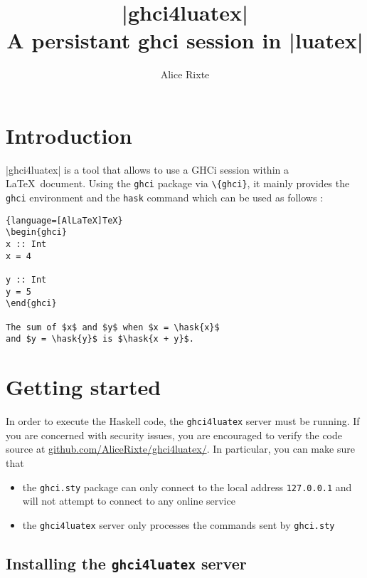 \documentclass{article}
\title{|ghci4luatex| \\ \vspace{0.4em}
  \large A persistant ghci session in |luatex|}
\author{Alice Rixte}
\begin{document}
\maketitle
\tableofcontents

\newpage

\section{Introduction}


|ghci4luatex| is a tool that allows to use a GHCi session within a \LaTeX\ document. Using the \texttt{ghci} package via \texttt{\textbackslash {}\{ghci\}}, it mainly provides the \texttt{ghci} environment and the \texttt{hask} command which can be used as follows :

\begin{latexbox}
  \begin{lstlisting}{language=[AlLaTeX]TeX}
\begin{ghci}
x :: Int
x = 4

y :: Int
y = 5
\end{ghci}

The sum of $x$ and $y$ when $x = \hask{x}$
and $y = \hask{y}$ is $\hask{x + y}$.

\end{lstlisting}
\end{latexbox}

\section{Getting started}

In order to execute the Haskell code, the \texttt{ghci4luatex} server must be running. If you are concerned with security issues, you are encouraged to verify the code source at \href{https://github.com/AliceRixte/ghci4luatex/}{github.com/AliceRixte/ghci4luatex/}. In particular, you can make sure that

\begin{itemize}
  \item  the \texttt{ghci.sty} package can only connect to the local address \texttt{127.0.0.1} and will not attempt to connect to any online service
  \item the \texttt{ghci4luatex} server only processes the commands sent by \texttt{ghci.sty}
\end{itemize}

\subsection{Installing the \texttt{ghci4luatex} server}
\end{document}
